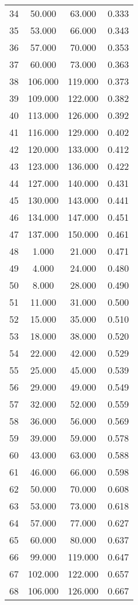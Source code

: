\begin{tabular}{cccc}
  34 & 50.000 & 63.000 & 0.333 \\ 
  35 & 53.000 & 66.000 & 0.343 \\ 
  36 & 57.000 & 70.000 & 0.353 \\ 
  37 & 60.000 & 73.000 & 0.363 \\ 
  38 & 106.000 & 119.000 & 0.373 \\ 
  39 & 109.000 & 122.000 & 0.382 \\ 
  40 & 113.000 & 126.000 & 0.392 \\ 
  41 & 116.000 & 129.000 & 0.402 \\ 
  42 & 120.000 & 133.000 & 0.412 \\ 
  43 & 123.000 & 136.000 & 0.422 \\ 
  44 & 127.000 & 140.000 & 0.431 \\ 
  45 & 130.000 & 143.000 & 0.441 \\ 
  46 & 134.000 & 147.000 & 0.451 \\ 
  47 & 137.000 & 150.000 & 0.461 \\ 
  48 & 1.000 & 21.000 & 0.471 \\ 
  49 & 4.000 & 24.000 & 0.480 \\ 
  50 & 8.000 & 28.000 & 0.490 \\ 
  51 & 11.000 & 31.000 & 0.500 \\ 
  52 & 15.000 & 35.000 & 0.510 \\ 
  53 & 18.000 & 38.000 & 0.520 \\ 
  54 & 22.000 & 42.000 & 0.529 \\ 
  55 & 25.000 & 45.000 & 0.539 \\ 
  56 & 29.000 & 49.000 & 0.549 \\ 
  57 & 32.000 & 52.000 & 0.559 \\ 
  58 & 36.000 & 56.000 & 0.569 \\ 
  59 & 39.000 & 59.000 & 0.578 \\ 
  60 & 43.000 & 63.000 & 0.588 \\ 
  61 & 46.000 & 66.000 & 0.598 \\ 
  62 & 50.000 & 70.000 & 0.608 \\ 
  63 & 53.000 & 73.000 & 0.618 \\ 
  64 & 57.000 & 77.000 & 0.627 \\ 
  65 & 60.000 & 80.000 & 0.637 \\ 
  66 & 99.000 & 119.000 & 0.647 \\ 
  67 & 102.000 & 122.000 & 0.657 \\ 
  68 & 106.000 & 126.000 & 0.667 \\ 

\end{tabular}

